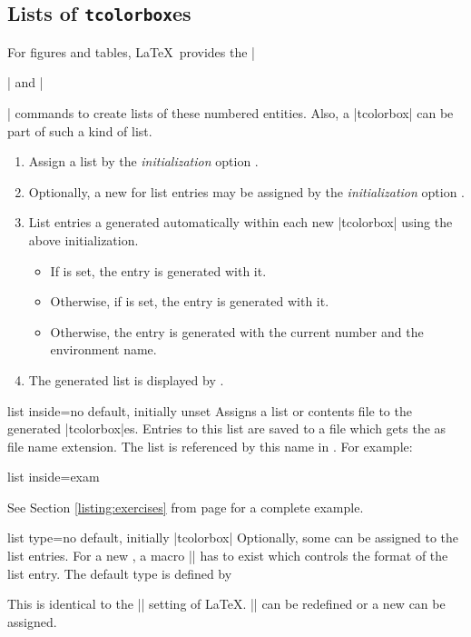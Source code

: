 \clearpage
\subsection{Lists of \texttt{tcolorbox}es}\label{sec:listsof}
For figures and tables, \LaTeX\ provides the |\listoffigures| and
|\listoftables| commands to create lists of these numbered entities.
Also, a |tcolorbox| can be part of such a kind of list.
\begin{enumerate}
\item Assign a list  by the \emph{initialization} option
  .
\item Optionally, a new  for list entries may be assigned
  by the \emph{initialization} option .
\item List entries a generated automatically within each new |tcolorbox|
  using the above initialization.
  \begin{itemize}
  \item If  is set, the entry is generated with it.
  \item Otherwise, if  is set, the entry is generated with it.
  \item Otherwise, the entry is generated with the current number and the environment name.
  \end{itemize}
\item The generated list is displayed by .
\end{enumerate}

\begin{newTcbKey}{list inside}{=}{no default, initially unset}
Assigns a list or contents file to the generated |tcolorbox|es.
Entries to this list are saved to a file which gets the  as
file name extension. The list is referenced by this name in
.
For example:
\begin{dispListing}
list inside=exam
\end{dispListing}
See Section \ref{listing:exercises} from page \pageref{listing:exercises}
for a complete example.
\end{newTcbKey}


\begin{newTcbKey}{list type}{=}{no default, initially |tcolorbox|}
Optionally, some  can be assigned to the list entries.
For a new , a macro |\l@| has to exist which controls
the format of the list entry. The default type is defined by
\begin{dispListing}
\newcommand*\l@tcolorbox{\@dottedtocline{1}{1.5em}{2.3em}}
\end{dispListing}
This is identical to the |\l@section| setting of \LaTeX. |\l@tcolorbox| can
be redefined or a new  can be assigned.
\end{newTcbKey}


